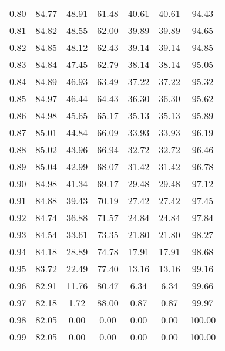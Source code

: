 \begin{tabular}{|c|c|c|c|c|c|c|}
      0.80 &     84.77 &     48.91 &      61.48 &   40.61 &      40.61 &         94.43 \\
      0.81 &     84.82 &     48.55 &      62.00 &   39.89 &      39.89 &         94.65 \\
      0.82 &     84.85 &     48.12 &      62.43 &   39.14 &      39.14 &         94.85 \\
      0.83 &     84.84 &     47.45 &      62.79 &   38.14 &      38.14 &         95.05 \\
      0.84 &     84.89 &     46.93 &      63.49 &   37.22 &      37.22 &         95.32 \\
      0.85 &     84.97 &     46.44 &      64.43 &   36.30 &      36.30 &         95.62 \\
      0.86 &     84.98 &     45.65 &      65.17 &   35.13 &      35.13 &         95.89 \\
      0.87 &     85.01 &     44.84 &      66.09 &   33.93 &      33.93 &         96.19 \\
      0.88 &     85.02 &     43.96 &      66.94 &   32.72 &      32.72 &         96.46 \\
      0.89 &     85.04 &     42.99 &      68.07 &   31.42 &      31.42 &         96.78 \\
      0.90 &     84.98 &     41.34 &      69.17 &   29.48 &      29.48 &         97.12 \\
      0.91 &     84.88 &     39.43 &      70.19 &   27.42 &      27.42 &         97.45 \\
      0.92 &     84.74 &     36.88 &      71.57 &   24.84 &      24.84 &         97.84 \\
      0.93 &     84.54 &     33.61 &      73.35 &   21.80 &      21.80 &         98.27 \\
      0.94 &     84.18 &     28.89 &      74.78 &   17.91 &      17.91 &         98.68 \\
      0.95 &     83.72 &     22.49 &      77.40 &   13.16 &      13.16 &         99.16 \\
      0.96 &     82.91 &     11.76 &      80.47 &    6.34 &       6.34 &         99.66 \\
      0.97 &     82.18 &      1.72 &      88.00 &    0.87 &       0.87 &         99.97 \\
      0.98 &     82.05 &      0.00 &       0.00 &    0.00 &       0.00 &        100.00 \\
      0.99 &     82.05 &      0.00 &       0.00 &    0.00 &       0.00 &        100.00 \\
\bottomrule
\end{tabular}
